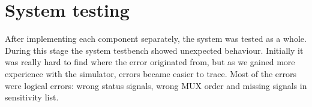 \section{System testing}
After implementing each component separately, the system was tested as a whole.
During this stage the system testbench showed unexpected behaviour.
Initially it was really hard to find where the error originated from,
but as we gained more experience with the simulator, errors became easier to trace.
Most of the errors were logical errors: wrong status signals, wrong MUX order and missing signals in sensitivity list.
